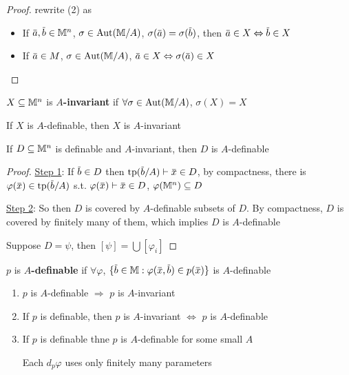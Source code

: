 \documentclass[11pt]{article}
\begin{document}
\begin{proof}
rewrite (2) as
\begin{itemize}
\item If \(\bara,\barb\in\M^n\), \(\sigma\in\operatorname{\text{Aut}}(\mathbb{M}/A)\), \(\sigma(\bara)=\sigma(\barb)\),
then \(\bara\in X\Leftrightarrow\barb\in X\)
\item If \(\bara\in M\), \(\sigma\in\operatorname{\text{Aut}}(\mathbb{M}/A)\), \(\bara\in X\Leftrightarrow\sigma(\bara)\in X\)
\end{itemize}
\end{proof}

\begin{definition}[]
\(X\subseteq\mathbb{M}^n\) is \textbf{\(A\)-invariant} if \(\forall\sigma\in\operatorname{\text{Aut}}(\mathbb{M}/A)\), \(\sigma(X)=X\)
\end{definition}

\begin{examplle}[]
If \(X\) is \(A\)-definable, then \(X\) is \(A\)-invariant
\end{examplle}

\begin{lemma}[]
\label{3.10.10}
If \(D\subseteq\mathbb{M}^n\) is definable and \(A\)-invariant, then \(D\) is \(A\)-definable
\end{lemma}

\begin{proof}
\uline{Step 1}: If \(\barb\in D\) then \(\tp(\barb/A)\vdash\barx\in D\), by compactness, there
is \(\varphi(\barx)\in\tp(\barb/A)\) s.t. \(\varphi(\barx)\vdash \barx\in D\), \(\varphi(\mathbb{M}^n)\subseteq D\)

\uline{Step 2}: So then \(D\) is covered by \(A\)-definable subsets of \(D\). By compactness, \(D\) is
covered by finitely many of them, which implies \(D\) is \(A\)-definable

Suppose \(D=\psi\), then \([\psi]=\bigcup[\varphi_i]\)
\end{proof}

\begin{definition}[]
\(p\) is \textbf{\(A\)-definable} if \(\forall\varphi\), \(\{\barb\in\M:\varphi(\barx,\barb)\in p(\barx)\}\) is \(A\)-definable
\end{definition}

\begin{remark}
\begin{enumerate}
\item \(p\) is \(A\)-definable \(\Rightarrow\) \(p\) is \(A\)-invariant
\item If \(p\) is definable, then \(p\) is \(A\)-invariant \(\Leftrightarrow\) \(p\) is \(A\)-definable
\item If \(p\) is definable thne \(p\) is \(A\)-definable for some small \(A\)

Each \(d_p\varphi\) uses only finitely many parameters
\end{enumerate}
\end{remark}
\end{document}
